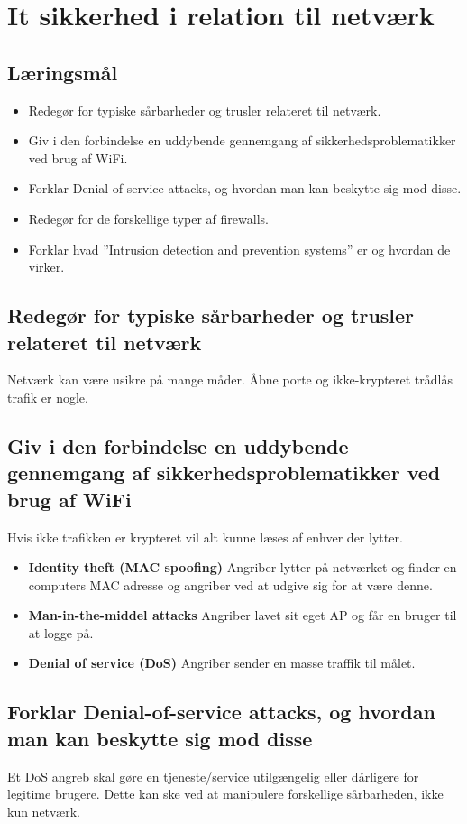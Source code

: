 \section{It sikkerhed i relation til netværk}

\subsection{Læringsmål}

\begin{itemize}
	\item Redegør for typiske sårbarheder og trusler relateret til netværk.
	\item Giv i den forbindelse en uddybende gennemgang af sikkerhedsproblematikker ved	brug af WiFi.
	\item Forklar Denial-of-service attacks, og hvordan man kan beskytte sig mod disse.
	\item Redegør for de forskellige typer af firewalls.
	\item Forklar hvad ”Intrusion detection and prevention systems” er og hvordan de virker.
\end{itemize}

\subsection{Redegør for typiske sårbarheder og trusler relateret til netværk}
Netværk kan være usikre på mange måder. Åbne porte og ikke-krypteret trådlås trafik er nogle.

\subsection{Giv i den forbindelse en uddybende gennemgang af sikkerhedsproblematikker ved brug af WiFi}
Hvis ikke trafikken er krypteret vil alt kunne læses af enhver der lytter. 

\begin{itemize}
	\item \textbf{Identity theft (MAC spoofing)} Angriber lytter på netværket og finder en computers MAC adresse og angriber ved at udgive sig for at være denne.
	\item \textbf{Man-in-the-middel attacks} Angriber lavet sit eget AP og får en bruger til at logge på.
	\item \textbf{Denial of service (DoS)} Angriber sender en masse traffik til målet.
\end{itemize}

\subsection{Forklar Denial-of-service attacks, og hvordan man kan beskytte sig mod disse}
Et DoS angreb skal gøre en tjeneste/service utilgængelig eller dårligere for legitime brugere. Dette kan ske ved at manipulere forskellige sårbarheden, ikke kun netværk.

